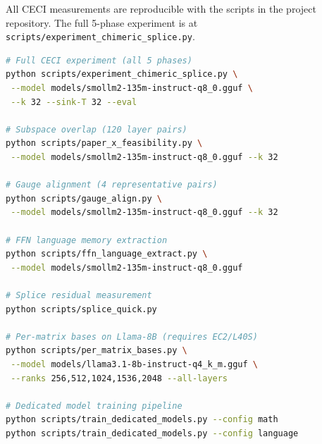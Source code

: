 \documentclass[11pt]{article}
\begin{document}
All CECI measurements are reproducible with the scripts in the
project repository. The full 5-phase experiment is at
\texttt{scripts/experiment\_chimeric\_splice.py}.

\begin{lstlisting}[language=bash]
# Full CECI experiment (all 5 phases)
python scripts/experiment_chimeric_splice.py \
 --model models/smollm2-135m-instruct-q8_0.gguf \
 --k 32 --sink-T 32 --eval

# Subspace overlap (120 layer pairs)
python scripts/paper_x_feasibility.py \
 --model models/smollm2-135m-instruct-q8_0.gguf --k 32

# Gauge alignment (4 representative pairs)
python scripts/gauge_align.py \
 --model models/smollm2-135m-instruct-q8_0.gguf --k 32

# FFN language memory extraction
python scripts/ffn_language_extract.py \
 --model models/smollm2-135m-instruct-q8_0.gguf

# Splice residual measurement
python scripts/splice_quick.py

# Per-matrix bases on Llama-8B (requires EC2/L40S)
python scripts/per_matrix_bases.py \
 --model models/llama3.1-8b-instruct-q4_k_m.gguf \
 --ranks 256,512,1024,1536,2048 --all-layers

# Dedicated model training pipeline
python scripts/train_dedicated_models.py --config math
python scripts/train_dedicated_models.py --config language
\end{lstlisting}

\printbibliography
\end{document}

